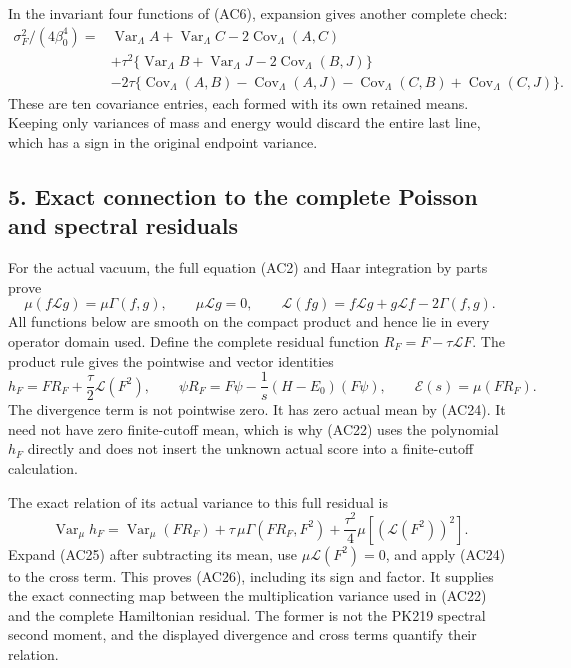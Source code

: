 \documentclass[11pt]{article}
\begin{document}
In the invariant four functions of (AC6), expansion gives another complete check:
\[
 \begin{aligned}
 \sigma_F^2/(4\beta_0^4)={}&
 \operatorname{Var}_\Lambda A+\operatorname{Var}_\Lambda C
                 -2\operatorname{Cov}_\Lambda(A,C)\\
 &+\tau^2\{\operatorname{Var}_\Lambda B+\operatorname{Var}_\Lambda J
                 -2\operatorname{Cov}_\Lambda(B,J)\}\\
 &-2\tau\{\operatorname{Cov}_\Lambda(A,B)
          -\operatorname{Cov}_\Lambda(A,J)
          -\operatorname{Cov}_\Lambda(C,B)
          +\operatorname{Cov}_\Lambda(C,J)\}.
 \end{aligned}\tag{AC23}
\]
These are ten covariance entries, each formed with its own retained means. Keeping only variances of mass and energy would discard the entire last line, which has a sign in the original endpoint variance.

\subsection*{5. Exact connection to the complete Poisson and spectral residuals}

For the actual vacuum, the full equation (AC2) and Haar integration by parts prove
\[
 \mu(f\mathcal Lg)=\mu\Gamma(f,g),\qquad
 \mu\mathcal Lg=0,\qquad
 \mathcal L(fg)=f\mathcal Lg+g\mathcal Lf-2\Gamma(f,g).
 \tag{AC24}
\]
All functions below are smooth on the compact product and hence lie in every operator domain used. Define the complete residual function \(R_F=F-\tau\mathcal LF\). The product rule gives the pointwise and vector identities
\[
 h_F=F R_F+\frac{\tau}{2}\mathcal L(F^2),\qquad
 \psi R_F=F\psi-\frac1s(H-E_0)(F\psi),\qquad
 \mathcal E(s)=\mu(FR_F).
 \tag{AC25}
\]
The divergence term is not pointwise zero. It has zero actual mean by (AC24). It need not have zero finite-cutoff mean, which is why (AC22) uses the polynomial \(h_F\) directly and does not insert the unknown actual score into a finite-cutoff calculation.

The exact relation of its actual variance to this full residual is
\[
 \operatorname{Var}_\mu h_F
 =\operatorname{Var}_\mu(FR_F)
   +\tau\,\mu\Gamma(FR_F,F^2)
   +\frac{\tau^2}{4}\mu[(\mathcal L(F^2))^2].
 \tag{AC26}
\]
Expand (AC25) after subtracting its mean, use \(\mu\mathcal L(F^2)=0\), and apply (AC24) to the cross term. This proves (AC26), including its sign and factor. It supplies the exact connecting map between the multiplication variance used in (AC22) and the complete Hamiltonian residual. The former is not the PK219 spectral second moment, and the displayed divergence and cross terms quantify their relation.
\end{document}
